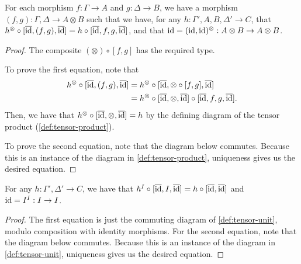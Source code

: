 \begin{lemma}\label{thm:tensor-product-terms}
  For each morphism $f : \Gamma \to A$ and $g : \Delta \to B$, we have a
  morphism $(f, g) : \Gamma, \Delta \to A \otimes B$ such that we have, for any
  $h : \Gamma', A, B, \Delta' \to C$, that
  $h^{\otimes} \circ [\overline{\operatorname{id}}, (f, g), \overline{\operatorname{id}}] =
  h \circ [\overline{\operatorname{id}}, f, g, \overline{\operatorname{id}}]$, and that
  $\operatorname{id} = (\operatorname{id}, \operatorname{id})^{\otimes} : A \otimes B \to A \otimes B$.
\end{lemma}
\begin{proof}
  The composite $(\otimes) \circ [f, g]$ has the required type.

  To prove the first equation, note that
  \begin{align*}
    h^{\otimes} \circ [\overline{\operatorname{id}}, (f, g), \overline{\operatorname{id}}]
    &= h^{\otimes} \circ [\overline{\operatorname{id}}, {\otimes} \circ [f, g], \overline{\operatorname{id}}] \\
    &= h^{\otimes} \circ [\overline{\operatorname{id}}, {\otimes}, \overline{\operatorname{id}}]
    \circ [\overline{\operatorname{id}}, f, g, \overline{\operatorname{id}}].
  \end{align*}
  Then, we have that
  $h^{\otimes} \circ [\overline{\operatorname{id}}, {\otimes}, \overline{\operatorname{id}}] = h$
  by the defining diagram of the tensor product (\cref{def:tensor-product}).

  To prove the second equation, note that the diagram below commutes.
  Because this is an instance of the diagram in \cref{def:tensor-product},
  uniqueness gives us the desired equation.

\end{proof}

\begin{lemma}\label{thm:tensor-unit-terms}
  For any $h : \Gamma', \Delta' \to C$, we have that
  $h^I \circ [\overline{\operatorname{id}}, I, \overline{\operatorname{id}}] =
  h \circ [\overline{\operatorname{id}}, \overline{\operatorname{id}}]$
  and $\operatorname{id} = I^I : I \to I$.
\end{lemma}
\begin{proof}
  The first equation is just the commuting diagram of \cref{def:tensor-unit},
  modulo composition with identity morphisms.
  For the second equation, note that the diagram below commutes.
  Because this is an instance of the diagram in \cref{def:tensor-unit},
  uniqueness gives us the desired equation.

\end{proof}


